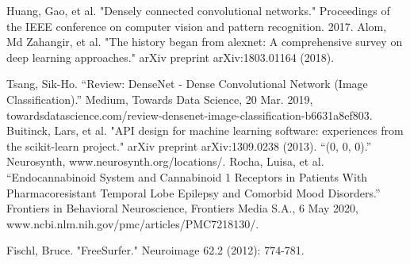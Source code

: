 \documentclass[conference]{IEEEtran}
\begin{document}
\begin{thebibliography}{00}
Huang, Gao, et al. "Densely connected convolutional networks." Proceedings of the IEEE conference on computer vision and pattern recognition. 2017.
 Alom, Md Zahangir, et al. "The history began from alexnet: A comprehensive survey on deep learning approaches." arXiv preprint arXiv:1803.01164 (2018).




 Tsang, Sik-Ho. “Review: DenseNet - Dense Convolutional Network (Image Classification).” Medium, Towards Data Science, 20 Mar. 2019, towardsdatascience.com/review-densenet-image-classification-b6631a8ef803. 
 Buitinck, Lars, et al. "API design for machine learning software: experiences from the scikit-learn project." arXiv preprint arXiv:1309.0238 (2013).
 “(0, 0, 0).” Neurosynth, www.neurosynth.org/locations/. 
 Rocha, Luisa, et al. “Endocannabinoid System and Cannabinoid 1 Receptors in Patients With Pharmacoresistant Temporal Lobe Epilepsy and Comorbid Mood Disorders.” Frontiers in Behavioral Neuroscience, Frontiers Media S.A., 6 May 2020, www.ncbi.nlm.nih.gov/pmc/articles/PMC7218130/. 

 Fischl, Bruce. "FreeSurfer." Neuroimage 62.2 (2012): 774-781.


\end{thebibliography}


\vspace{12pt}
\end{document}
